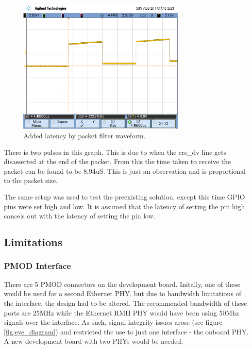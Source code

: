 \begin{figure}[h!]
    \centering
    \includegraphics[width=0.75\textwidth]{Images/scope_4.png}
    \caption[Added latency by packet filter waveform]{Added latency by packet filter waveform.}
    \label{fig:packet_classifier_architecture}
\end{figure}

There is two pulses in this graph. This is due to when the crs\_dv line gets disasserted at the end of the packet. From this the time taken to receive the packet can be found to be 8.94uS. This is just an observation and is proportional to the packet size.



The same setup was used to test the preexisting solution, except this time GPIO pins were set high and low. It is assumed that the latency of setting the pin high cancels out with the latency of setting the pin low. 

\subsection{Limitations}
\subsubsection{PMOD Interface}

There are 5 PMOD connectors on the development board. Initally, one of these would be used for a second Ethernet PHY, but due to bandwidth limitations of the interface, the design had to be altered. The recommended bandwidth of these ports are 25MHz while the Ethernet RMII PHY would have been using 50Mhz signals over the interface. As such, signal integrity issues arose (see figure \ref{fig:eye_diagram}) and restricted the use to just one interface - the onboard PHY. A new development board with two PHYs would be needed.

